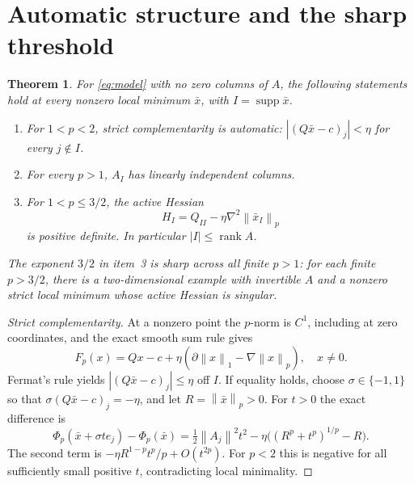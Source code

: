 \documentclass[11pt]{article}
\newcommand{\norm}[1]{\left\lVert#1\right\rVert}
\newcommand{\supp}{\operatorname{supp}}
\newtheorem{theorem}{Theorem}[section]
\theoremstyle{remark}\newtheorem{remark}[theorem]{Remark}
\begin{document}
\section{Automatic structure and the sharp threshold}
\begin{theorem}\label{thm:automatic}
For \eqref{eq:model} with no zero columns of $A$, the following statements
hold at every nonzero local minimum $\bar x$, with $I=\supp\bar x$.
\begin{enumerate}
\item For $1<p<2$, strict complementarity is automatic:
$|(Q\bar x-c)_j|<\eta$ for every $j\notin I$.
\item For every $p>1$, $A_I$ has linearly independent columns.
\item For $1<p\le3/2$, the active Hessian
\begin{equation}\label{eq:activeH}
 H_I=Q_{II}-\eta\nabla^2\norm{\bar x_I}_p
\end{equation}
is positive definite. In particular $|I|\le\operatorname{rank}A$.
\end{enumerate}
The exponent $3/2$ in item~3 is sharp across all finite $p>1$: for each
finite $p>3/2$, there is a two-dimensional example with invertible $A$
and a nonzero strict local minimum whose active Hessian is singular.
\end{theorem}
\begin{proof}[Strict complementarity]
At a nonzero point the $p$-norm is $C^1$, including at zero coordinates,
and the exact smooth sum rule gives
\begin{equation}\label{eq:Fnonzero}
 F_p(x)=Qx-c+\eta(\partial\norm{x}_1-\nabla\norm{x}_p),\quad x\ne0.
\end{equation}
Fermat's rule yields $|(Q\bar x-c)_j|\le\eta$ off $I$.
If equality holds, choose $\sigma\in\{-1,1\}$ so that
$\sigma(Q\bar x-c)_j=-\eta$, and let $R=\norm{\bar x}_p>0$.
For $t>0$ the exact difference is
\[
 \Phi_p(\bar x+\sigma t e_j)-\Phi_p(\bar x)
 =\tfrac12\norm{A_j}^2t^2-
 \eta\big((R^p+t^p)^{1/p}-R\big).
\]
The second term is $-\eta R^{1-p}t^p/p+O(t^{2p})$.
For $p<2$ this is negative for all sufficiently small positive $t$,
contradicting local minimality.
\end{proof}
\end{document}
